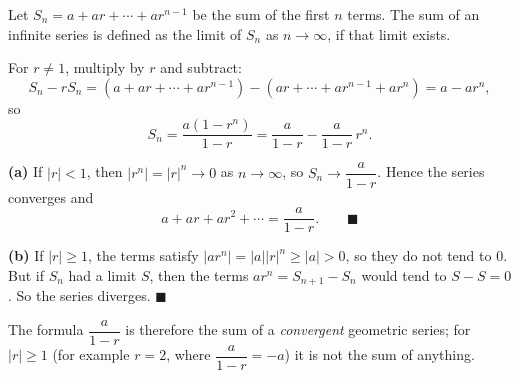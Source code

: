 Let $S_n=a+ar+\cdots+ar^{n-1}$ be the sum of the first $n$ terms. The sum of an infinite series is defined as the limit of $S_n$ as $n\to\infty$, if that limit exists.

For $r\ne1$, multiply by $r$ and subtract:
\[
S_n-rS_n=\left(a+ar+\cdots+ar^{n-1}\right)-\left(ar+\cdots+ar^{n-1}+ar^n\right)=a-ar^n,
\]
so
\[
S_n=\dfrac{a\left(1-r^n\right)}{1-r}=\dfrac{a}{1-r}-\dfrac{a}{1-r}\,r^n .
\]

\textbf{(a)} If $|r|<1$, then $|r^n|=|r|^n\to0$ as $n\to\infty$, so $S_n\to\dfrac{a}{1-r}$. Hence the series converges and
\[
a+ar+ar^2+\cdots=\dfrac{a}{1-r}. \qquad\blacksquare
\]

\textbf{(b)} If $|r|\ge1$, the terms satisfy $|ar^n|=|a||r|^n\ge|a|>0$, so they do not tend to $0$. But if $S_n$ had a limit $S$, then the terms $ar^n=S_{n+1}-S_n$ would tend to $S-S=0$. So the series diverges. $\blacksquare$

The formula $\dfrac{a}{1-r}$ is therefore the sum of a \emph{convergent} geometric series; for $|r|\ge1$ (for example $r=2$, where $\dfrac{a}{1-r}=-a$) it is not the sum of anything.
